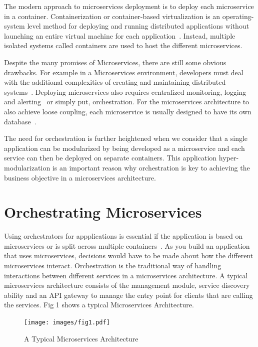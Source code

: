 The modern approach to microservices deployment is to deploy each
microservice in a container. Containerization or container-based
virtualization is an operating-system level method for deploying and
running distributed applications without launching an entire virtual
machine for each application~\cite{hid-sp18-501-techtarget}. Instead,
multiple isolated systems called containers are used to host the
different microservices.

Despite the many promises of Microservices, there are still some
obvious drawbacks. For example in a Microservices environment,
developers must deal with the additional complexities of creating and
maintaining distributed
systems~\cite{hid-sp18-501-patterns}. Deploying microservices also
requires centralized monitoring, logging and
alerting~\cite{hid-sp18-501-challenges} or simply put,
orchestration. For the microservices architecture to also achieve
loose coupling, each microservice is usually designed to have its own
database~\cite{hid-sp18-501-patterns}.

The need for orchestration is further heightened when we consider that
a single application can be modularized by being developed as a
microservice and each service can then be deployed on separate
containers. This application hyper-modularization is an important
reason why orchestration is key to achieving the business objective in
a microservices architecture.


\section{Orchestrating Microservices}
Using orchestrators for appplications is essential if the application
is based on microservices or is split across multiple
containers~\cite{hid-sp18-501-dotnet}. As you build an application
that uses microservices, decisions would have to be made about how the
different microservices interact. Orchestration is the traditional way
of handling interactions between different services in a microservices
architecture. A typical microservices architecture consists of the
management module, service discovery ability and an API gateway to
manage the entry point for clients that are calling the services.  Fig
1 shows a typical Microservices Architecture.

\begin{figure}[!ht]
  \centering\texttt{[image: images/fig1.pdf]}
  \caption{A Typical Microservices Architecture~\cite{hid-sp18-501-fig1}}
\label{f:architecture}
\end{figure}

